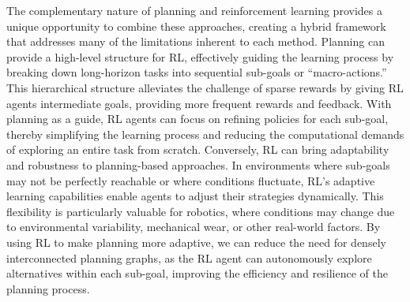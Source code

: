 The complementary nature of planning and reinforcement learning provides a unique opportunity to combine these
approaches, creating a hybrid framework that addresses many of the limitations inherent to each method.
Planning can provide a high-level structure for RL, effectively guiding the learning process by breaking down
long-horizon tasks into sequential sub-goals or “macro-actions.” This hierarchical structure alleviates the challenge
of sparse rewards by giving RL agents intermediate goals, providing more frequent rewards and feedback.
With planning as a guide, RL agents can focus on refining policies for each sub-goal, thereby simplifying the learning
process and reducing the computational demands of exploring an entire task from scratch.
Conversely, RL can bring adaptability and robustness to planning-based approaches.
In environments where sub-goals may not be perfectly reachable or where conditions fluctuate, RL’s adaptive learning
capabilities enable agents to adjust their strategies dynamically.
This flexibility is particularly valuable for robotics, where conditions may change due to environmental variability,
mechanical wear, or other real-world factors.
By using RL to make planning more adaptive, we can reduce the need for densely interconnected planning graphs, as the
RL agent can autonomously explore alternatives within each sub-goal, improving the efficiency and resilience of the
planning process.

